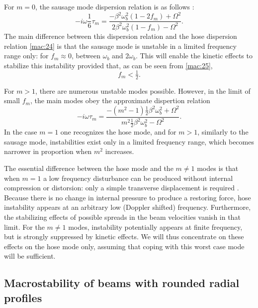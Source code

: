 \documentclass [12pt,a4paper,     ]{report} %
\newcommand{\Oh}{\tfrac{1}{2}}        %
\begin{document}
	For $m=0$, the sausage mode dispersion relation is as follows \cite{UHM--1981-,LEE--1981-} :
%
\begin{equation}\label{mac:25} %
      -i\omega\frac{1}{6}\tau_m = 
        \frac{-\beta^2\omega_b^2(1-2f_m) +\Omega^2}
             {2\beta^2\omega_b^2(1-f_m) - \Omega^2}.
\end{equation}
%
The main difference between this dispersion relation and the hose dispersion relation \eqref{mac:24} is that the sausage mode is unstable in a limited frequency range only: for $f_m\approx 0$, between $\omega_b$ and $2\omega_b$.  This will enable the kinetic effects to stabilize this instability provided that, as can be seen from \eqref{mac:25},
%
\begin{equation}\label{mac:26} %
                          f_m < \Oh.
\end{equation}
%

	For $m>1$, there are numerous unstable modes possible.  However, in the limit of small $f_m$, the main modes obey the approximate dispertion relation \cite{WEINB1967-}
%
\begin{equation}\label{mac:27} %
      -i\omega\tau_m = 
        \frac{-(m^2-1)\Oh\beta^2\omega_b^2 +\Omega^2}
             {m^2\Oh\beta^2\omega_b^2 - \Omega^2}.
\end{equation}
%
In the case $m=1$ one recognizes the hose mode, and for $m>1$, similarly to the sausage mode, instabilities exist only in a limited frequency range, which becomes narrower in proportion when $m^2$ increases.

	The essential difference between the hose mode and the $m\neq 1$ modes is that when $m=1$ a low frequency disturbance can be produced without internal compression or distorsion: only a simple transverse displacement is required \cite{WEINB1967-,LEE--1978-}.  Because there is no change in internal pressure to produce a restoring force, hose instability appears at an arbitrary low (Doppler shifted) frequency.  Furthermore, the stabilizing effects of possible spreads in the beam velocities vanish in that limit.  For the $m\neq 1$ modes, instability potentially appears at finite frequency, but is strongly suppressed by kinetic effects.  We will thus concentrate on these effects on the hose mode only, assuming that coping with this worst case mode will be sufficient.


\subsection{Macrostability of beams with rounded radial profiles}
\end{document}
